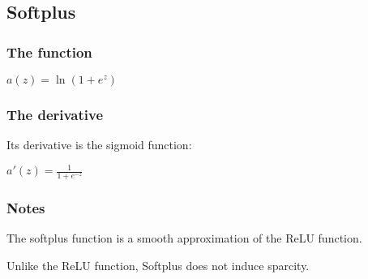 
\subsection{Softplus}

\subsubsection{The function}

\(a(z)=\ln (1+e^z)\)

\subsubsection{The derivative}

Its derivative is the sigmoid function:

\(a'(z)=\frac{1}{1+e^{-z}}\)

\subsubsection{Notes}

The softplus function is a smooth approximation of the ReLU function.

Unlike the ReLU function, Softplus does not induce sparcity.

